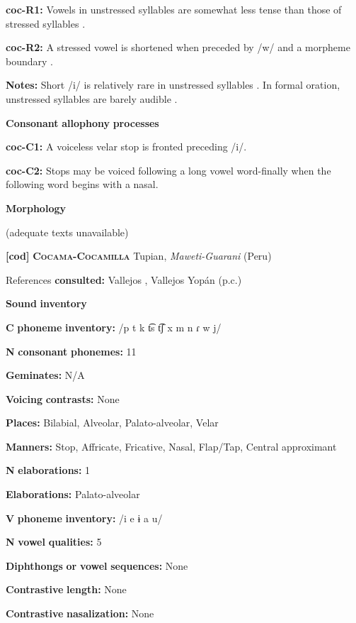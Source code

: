 \begin{styleBody}
\textbf{coc-R1:} Vowels in unstressed syllables are somewhat less tense than those of stressed syllables \citep[22]{Crawford1966}.

\textbf{coc-R2:} A stressed vowel is shortened when preceded by /w/ and a morpheme boundary \citep[67]{Bendixen1980}.

\textbf{Notes:} Short /i/ is relatively rare in unstressed syllables \citep[32]{Crawford1966}. In formal oration, unstressed syllables are barely audible \citep[332-3]{Bendixen1980}.

\textbf{Consonant} \textbf{allophony} \textbf{processes}

\textbf{coc-C1:} A voiceless velar stop is fronted preceding /i/. \citep[15]{Crawford1966}

\textbf{coc-C2:} Stops may be voiced following a long vowel word-finally when the following word begins with a nasal. \citep[99-100]{Bendixen1980}

\textbf{Morphology}

(adequate texts unavailable)

\textbf{[cod]}   \textbf{\textsc{Cocama-Cocamilla}}  Tupian, \textit{Maweti-Guarani} (Peru)

References \textbf{consulted:} Vallejos \citet{Yopán2010}, Vallejos Yopán (p.c.)

\textbf{Sound} \textbf{inventory}

\textbf{C} \textbf{phoneme} \textbf{inventory:} /p t k t͡s t͡ʃ x m n ɾ w j/

\textbf{N} \textbf{consonant} \textbf{phonemes:} 11

\textbf{Geminates:} N/A

\textbf{Voicing} \textbf{contrasts:} None

\textbf{Places:} Bilabial, Alveolar, Palato-alveolar, Velar

\textbf{Manners:} Stop, Affricate, Fricative, Nasal, Flap/Tap, Central approximant

\textbf{N} \textbf{elaborations:} 1

\textbf{Elaborations:} Palato-alveolar

\textbf{V} \textbf{phoneme} \textbf{inventory:} /i e ɨ a u/

\textbf{N} \textbf{vowel} \textbf{qualities:} 5

\textbf{Diphthongs} \textbf{or} \textbf{vowel} \textbf{sequences:} None

\textbf{Contrastive} \textbf{length:} None

\textbf{Contrastive} \textbf{nasalization:} None


\end{styleBody}
